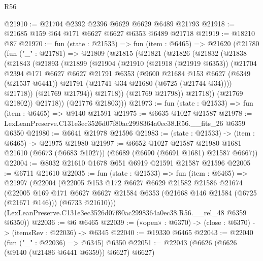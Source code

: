 \begin{lexlean}{R56}
\begin{coremodule}
@21910 := @21704 @2392 @2396 @6629 @6629 @6489 @21793
@21918 := @21685 @159 @64 @171 @6627 @6627 @6353 @6489 @21718
@21919 := @18210 @87
@21970 := fun (state : @21533) =>
  fun (item : @6465) =>
  @21620
    (@21780
      (fun ("_" : @21781) =>
      @21809
        (@21815
          (@21821
            (@21826
              (@21832
                (@21838
                  (@21843
                    (@21893
                      (@21899
                        (@21904
                          (@21910
                            (@21918 (@21919 @6353))
                            (@21704
                              @2394
                              @171
                              @6627
                              @6627
                              @21791
                              @6353
                              (@9600
                                @21684
                                @153
                                @6627
                                (@6349 (@21537 @6441))
                                @21791
                                (@21741 @34 @21680 (@6725 (@21744 @34))))
                              @21718))
                          (@21769 @21794))
                        @21718))
                    (@21769 @21798))
                  @21718))
              (@21769 @21802))
            @21718))
        (@21776 @21803)))
@21973 := fun (state : @21533) => fun (item : @6465) => @9140 @21591
@21975 := @6635 @1027 @21587
@21978 := LexLeanPreserve.C131e3ec3526d07f80ac2998364a0ec38.R56.__fits_26 @6359 @6350
@21980 := @6641 @21978 @21596
@21983 := (state : @21533) -> (item : @6465) -> @21975 @21980
@21997 := @6652
    @1027
    @21587
    @21980
    @1681
    @21610
    (@6673 (@6683 @1027))
    (@6689 (@6690 (@6691 @1681) @21587 @6667))
@22004 := @8032 @21610 @1678 @651 @6919 @21591 @21587 @21596
@22005 := @6711 @21610
@22035 := fun (state : @21533) =>
  fun (item : @6465) =>
  @21997
    (@22004
      (@22005
        @153
        @172
        @6627
        @6629
        @21582
        @21586
        @21674
        (@22005
          @169
          @171
          @6627
          @6627
          @21584
          @6353
          (@21668 @146 @21584 (@6725 (@21671 @146)))
          (@6733 @21610)))
      (LexLeanPreserve.C131e3ec3526d07f80ac2998364a0ec38.R56.__rel_48 @6359 @6350))
@22036 := @6 @6465
@22039 := («open» : @6370) -> (close : @6370) -> (itemsRev : @22036) -> @6345
@22040 := @19330 @6465
@22043 := @22040 (fun ("_" : @22036) => @6345) @6350
@22051 := @22043 (@6626 (@6626 (@9140 (@21486 @6441 @6359)) @6627) @6627)

\end{coremodule}
\end{lexlean}
